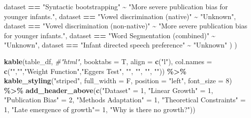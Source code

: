 \documentclass[
]{article}
\newenvironment{Shaded}{\begin{snugshade}}{\end{snugshade}}
\newcommand{\AttributeTok}[1]{\textcolor[rgb]{0.13,0.29,0.53}{#1}}
\newcommand{\CommentTok}[1]{\textcolor[rgb]{0.56,0.35,0.01}{\textit{#1}}}
\newcommand{\DecValTok}[1]{\textcolor[rgb]{0.00,0.00,0.81}{#1}}
\newcommand{\FunctionTok}[1]{\textcolor[rgb]{0.13,0.29,0.53}{\textbf{#1}}}
\newcommand{\NormalTok}[1]{#1}
\newcommand{\OtherTok}[1]{\textcolor[rgb]{0.56,0.35,0.01}{#1}}
\newcommand{\SpecialCharTok}[1]{\textcolor[rgb]{0.81,0.36,0.00}{\textbf{#1}}}
\newcommand{\StringTok}[1]{\textcolor[rgb]{0.31,0.60,0.02}{#1}}
\begin{document}
\begin{Shaded}
\begin{Highlighting}[]
\NormalTok{      dataset }\SpecialCharTok{==} \StringTok{"Syntactic bootstrapping"} \SpecialCharTok{\textasciitilde{}} \StringTok{"More severe publication bias for younger infants."}\NormalTok{, }
\NormalTok{      dataset }\SpecialCharTok{==} \StringTok{"Vowel discrimination (native)"} \SpecialCharTok{\textasciitilde{}} \StringTok{"Unknown"}\NormalTok{, }
\NormalTok{      dataset }\SpecialCharTok{==} \StringTok{"Vowel discrimination (non{-}native)"} \SpecialCharTok{\textasciitilde{}} \StringTok{"More severe publication bias for younger infants."}\NormalTok{,}
\NormalTok{      dataset }\SpecialCharTok{==} \StringTok{"Word Segmentation (combined)"} \SpecialCharTok{\textasciitilde{}} \StringTok{"Unknown"}\NormalTok{, }
\NormalTok{      dataset }\SpecialCharTok{==} \StringTok{"Infant directed speech preference"} \SpecialCharTok{\textasciitilde{}} \StringTok{"Unknown"}
\NormalTok{    )}
\NormalTok{  )}
  
  
\FunctionTok{kable}\NormalTok{(table\_df,}
      \CommentTok{\#"html",}
      \AttributeTok{booktabs =}\NormalTok{ T,}
      \AttributeTok{align =} \FunctionTok{c}\NormalTok{(}\StringTok{"l"}\NormalTok{),}
      \AttributeTok{col.names =} \FunctionTok{c}\NormalTok{(}\StringTok{""}\NormalTok{,}\StringTok{""}\NormalTok{,}\StringTok{"Weight Function"}\NormalTok{,}\StringTok{"Egger\textquotesingle{}s Test"}\NormalTok{, }\StringTok{""}\NormalTok{, }\StringTok{""}\NormalTok{, }\StringTok{""}\NormalTok{, }\StringTok{""}\NormalTok{)) }\SpecialCharTok{\%\textgreater{}\%}
  \FunctionTok{kable\_styling}\NormalTok{(}\StringTok{"striped"}\NormalTok{, }\AttributeTok{full\_width =}\NormalTok{ F,}
                \AttributeTok{position =} \StringTok{"left"}\NormalTok{, }\AttributeTok{font\_size =} \DecValTok{8}\NormalTok{) }\SpecialCharTok{\%\textgreater{}\%} 
  \FunctionTok{add\_header\_above}\NormalTok{(}\FunctionTok{c}\NormalTok{(}\StringTok{"Dataset"} \OtherTok{=} \DecValTok{1}\NormalTok{, }\StringTok{"Linear Growth"} \OtherTok{=} \DecValTok{1}\NormalTok{, }\StringTok{"Publication Bias"} \OtherTok{=} \DecValTok{2}\NormalTok{, }
                   \StringTok{"Methods Adaptation"} \OtherTok{=} \DecValTok{1}\NormalTok{, }\StringTok{"Theoretical Constraints"} \OtherTok{=} \DecValTok{1}\NormalTok{, }\StringTok{"Late emergence of growth"}\OtherTok{=} \DecValTok{1}\NormalTok{, }\StringTok{"Why is there no growth?"}\NormalTok{))  }
\end{Highlighting}
\end{Shaded}

\begingroup\fontsize{8}{10}\selectfont
\end{document}
